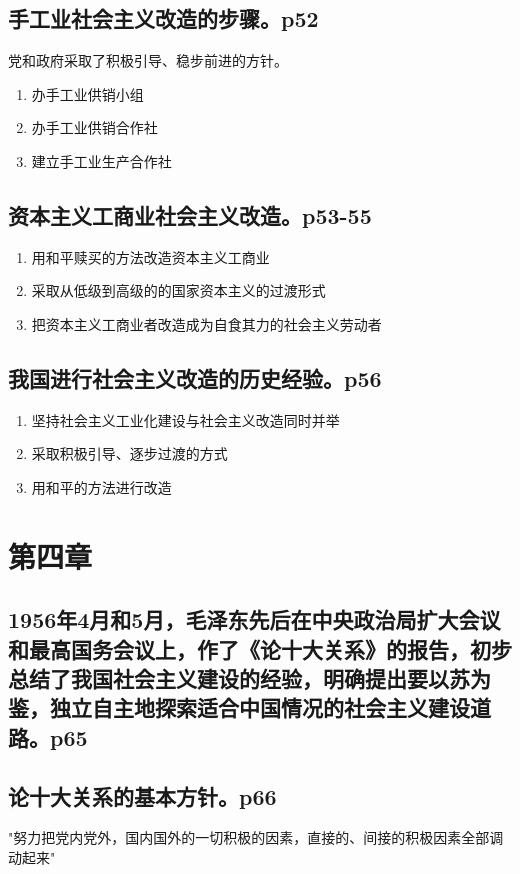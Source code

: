 \documentclass[UTF8]{ctexart}
\begin{document}
\subsection{手工业社会主义改造的步骤。p52}
\par 党和政府采取了积极引导、稳步前进的方针。
\begin{enumerate}[(1)]
    \item 办手工业供销小组
    \item 办手工业供销合作社
    \item 建立手工业生产合作社
\end{enumerate}
\subsection{资本主义工商业社会主义改造。p53-55}
\begin{enumerate}[(1)]
    \item 用和平赎买的方法改造资本主义工商业
    \item 采取从低级到高级的的国家资本主义的过渡形式
    \item 把资本主义工商业者改造成为自食其力的社会主义劳动者
\end{enumerate}
\subsection{我国进行社会主义改造的历史经验。p56}
\begin{enumerate}[(1)]
    \item 坚持社会主义工业化建设与社会主义改造同时并举
    \item 采取积极引导、逐步过渡的方式
    \item 用和平的方法进行改造
\end{enumerate}
\section{第四章}
\subsection{1956年4月和5月，毛泽东先后在中央政治局扩大会议和最高国务会议上，作了《论十大关系》的报告，初步总结了我国社会主义建设的经验，明确提出要以苏为鉴，独立自主地探索适合中国情况的社会主义建设道路。p65}
\subsection{论十大关系的基本方针。p66}
\par "努力把党内党外，国内国外的一切积极的因素，直接的、间接的积极因素全部调动起来"
\end{document}
